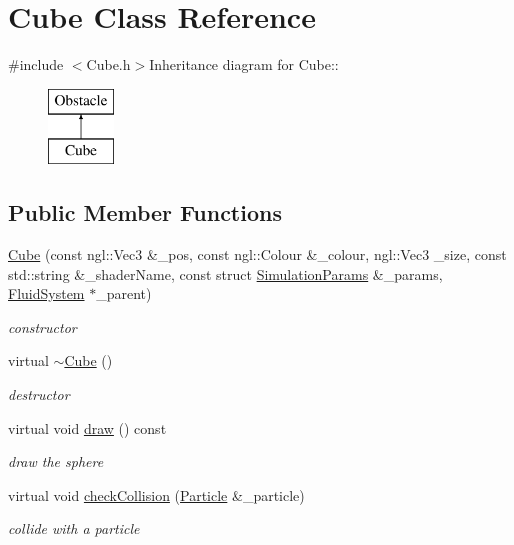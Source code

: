 \hypertarget{classCube}{
\section{Cube Class Reference}
\label{classCube}
}


{\ttfamily \#include $<$Cube.h$>$}Inheritance diagram for Cube::\begin{figure}[H]
\begin{center}
\leavevmode
\includegraphics[height=2cm]{classCube}
\end{center}
\end{figure}
\subsection*{Public Member Functions}
\begin{DoxyCompactItemize}
\item 
\hyperlink{classCube_a4e53462d63d55146162a2b0dec143b9c}{Cube} (const ngl::Vec3 \&\_\-pos, const ngl::Colour \&\_\-colour, ngl::Vec3 \_\-size, const std::string \&\_\-shaderName, const struct \hyperlink{structSimulationParams}{SimulationParams} \&\_\-params, \hyperlink{classFluidSystem}{FluidSystem} $\ast$\_\-parent)
\begin{DoxyCompactList}\small\item\em constructor \item\end{DoxyCompactList}\item 
virtual \hyperlink{classCube_aa814e979cecb8c451fdb332ded2cea1e}{$\sim$Cube} ()
\begin{DoxyCompactList}\small\item\em destructor \item\end{DoxyCompactList}\item 
virtual void \hyperlink{classCube_ab4dbd130d15e86b30212dad3189d1016}{draw} () const 
\begin{DoxyCompactList}\small\item\em draw the sphere \item\end{DoxyCompactList}\item 
virtual void \hyperlink{classCube_a6e53f829d8ebcbd53ea462e53d07f64f}{checkCollision} (\hyperlink{classParticle}{Particle} \&\_\-particle)
\begin{DoxyCompactList}\small\item\em collide with a particle \item\end{DoxyCompactList}\end{DoxyCompactItemize}


